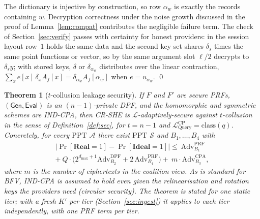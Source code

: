 \documentclass[a4paper,fleqn]{cas-sc}
\newtheorem{theorem}{Theorem}
\newcommand{\PPT}{\mathrm{PPT}}
\newcommand{\Real}{\mathbf{Real}}
\newcommand{\Ideal}{\mathbf{Ideal}}
\newcommand{\Leak}{\mathcal{L}}
\newcommand{\Sim}{\mathcal{S}}
\newcommand{\Adv}{\mathcal{A}}
\newcommand{\Gen}{\mathsf{Gen}}
\newcommand{\Eval}{\mathsf{Eval}}
\begin{document}
\begin{pf}
The dictionary is injective by construction, so row $\alpha_w$ is exactly the
records containing $w$. Decryption correctness under the noise growth
discussed in the proof of Lemma~\ref{lem:compat} contributes the negligible
failure term. The check of Section~\ref{sec:verify} passes with certainty for
honest providers: in the session layout row~$1$ holds the same data and the
second key set shares $\delta_s$ times the same point functions or vector, so
by the same argument slot $\ell/2$ decrypts to $\delta_sy$; with stored keys,
$\delta$ or $\delta_{\alpha_w}$ distributes over the linear contraction,
$\sum_x e[x]\,\delta_xA_f[x]=\delta_{\alpha_w}A_f[\alpha_w]$ when
$e=u_{\alpha_w}$. \qed
\end{pf}

\begin{theorem}[$t$-collusion leakage security]
\label{thm:sec}
If $F$ and $F'$ are secure PRFs, $(\Gen,\Eval)$ is an $(n{-}1)$-private DPF, and the
homomorphic and symmetric schemes are IND-CPA, then CR-SHE is
$\Leak$-adaptively-secure against $t$-collusion in the sense of
Definition~\ref{def:sec}, for $t=n-1$ and
$\Leak^{\text{CP}}_{\mathrm{Query}}=\mathrm{class}(q)$. Concretely, for every
$\PPT$ $\Adv$ there exist $\PPT$ $\Sim$ and $B_1,\dots,B_4$ with
\begin{multline*}
\big|\Pr[\Real{=}1]-\Pr[\Ideal{=}1]\big|
\le\ \mathrm{Adv}^{\mathrm{PRF}}_{B_1}\\
+\ Q\cdot\big(2^{d_{\max}+1}\mathrm{Adv}^{\mathrm{DPF}}_{B_2}
+2\,\mathrm{Adv}^{\mathrm{PRF}}_{B_4}\big)
+\ m\cdot\mathrm{Adv}^{\mathrm{CPA}}_{B_3},
\end{multline*}
where $m$ is the number of ciphertexts in the coalition view. As is standard
for BFV, IND-CPA is assumed to hold even given the relinearisation and
rotation keys the providers need (circular security). The theorem is stated
for one static tier; with a fresh $K'$ per tier
(Section~\ref{sec:ingest}) it applies to each tier independently, with one PRF
term per tier.
\end{theorem}
\end{document}
